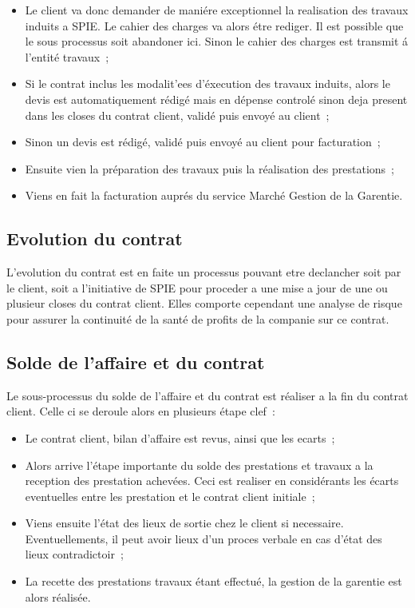 \begin{itemize}
    \item Le client va donc demander de mani\'ere exceptionnel la realisation des travaux induits a
    SPIE. Le cahier des charges va alors \'etre rediger. Il est possible que le sous processus soit
    abandoner ici. Sinon le cahier des charges est transmit \'a l'entit\'e travaux~;
    \item Si le contrat inclus les modalit'ees d'\'execution des travaux induits, alors le devis est
    automatiquement r\'edig\'e mais en d\'epense control\'e sinon deja present dans les closes du
    contrat client, valid\'e puis envoy\'e au client~;
    \item Sinon un devis est r\'edig\'e, valid\'e puis envoy\'e au client pour facturation~;
    \item Ensuite vien la pr\'eparation des travaux puis la r\'ealisation des prestations~;
    \item Viens en fait la facturation aupr\'es du service March\'e Gestion de la Garentie.
\end{itemize}

\subsection{Evolution du contrat}

L'evolution du contrat  est en faite un processus pouvant etre declancher soit par le client, soit
a l'initiative de SPIE pour proceder a une mise a jour de une ou plusieur closes du contrat client.
Elles comporte cependant une analyse de risque pour assurer la continuit\'e de la sant\'e de profits
de la companie sur ce contrat.


\subsection{Solde de l'affaire et du contrat}

Le sous-processus du solde de l'affaire et du contrat est r\'ealiser a la fin du contrat client. Celle
ci se deroule alors en plusieurs \'etape clef~:

\begin{itemize}
    \item Le contrat client, bilan d'affaire est revus, ainsi que les ecarts~;
    \item Alors arrive l'\'etape importante du solde des prestations et travaux a la reception des
    prestation achev\'ees. Ceci est realiser en consid\'erants les \'ecarts eventuelles entre les
    prestation et le contrat client initiale~;
    \item Viens ensuite l'\'etat des lieux de sortie chez le client si necessaire. Eventuellements,
    il peut avoir lieux d'un proces verbale en cas d'\'etat des lieux contradictoir~;
    \item La recette des prestations travaux \'etant effectu\'e, la gestion de la garentie est alors
    r\'ealis\'ee.
\end{itemize}

